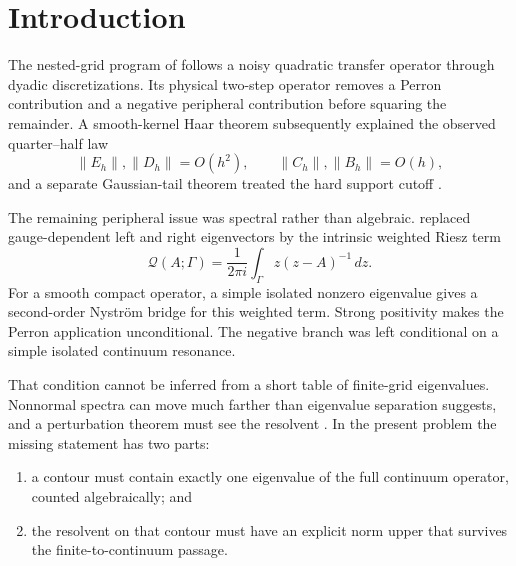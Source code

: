 \documentclass[11pt]{article}
\theoremstyle{definition}
\theoremstyle{remark}
\newcommand{\cQ}{\mathcal Q}
\newcommand{\norm}[1]{\left\lVert #1\right\rVert}
\begin{document}
\section{Introduction}
\label{sec:introduction}

The nested-grid program of
\citet{WangNested2026,WangIterated2026} follows a noisy quadratic transfer
operator through dyadic discretizations.  Its physical two-step operator
removes a Perron contribution and a negative peripheral contribution before
squaring the remainder.  A smooth-kernel Haar theorem subsequently
explained the observed quarter--half law
\[
 \norm{E_h},\norm{D_h}=O(h^2),\qquad
 \norm{C_h},\norm{B_h}=O(h),
\]
and a separate Gaussian-tail theorem treated the hard support cutoff
\citep{WangHaar2026,WangCutoff2026}.

The remaining peripheral issue was spectral rather than algebraic.
\citet{WangRiesz2026} replaced gauge-dependent left and right eigenvectors
by the intrinsic weighted Riesz term
\[
 \cQ(A;\Gamma)
 =\frac{1}{2\pi i}\int_\Gamma z(z-A)^{-1}\,dz.
\]
For a smooth compact operator, a simple isolated nonzero eigenvalue gives a
second-order Nystr\"om bridge for this weighted term.  Strong positivity
makes the Perron application unconditional.  The negative branch was left
conditional on a simple isolated continuum resonance.

That condition cannot be inferred from a short table of finite-grid
eigenvalues.  Nonnormal spectra can move much farther than eigenvalue
separation suggests, and a perturbation theorem must see the resolvent
\citep{TrefethenEmbree2005,Kato1995}.  In the present problem the missing
statement has two parts:
\begin{enumerate}[leftmargin=2em]
 \item a contour must contain exactly one eigenvalue of the full continuum
       operator, counted algebraically; and
 \item the resolvent on that contour must have an explicit norm upper that
       survives the finite-to-continuum passage.
\end{enumerate}
\end{document}
